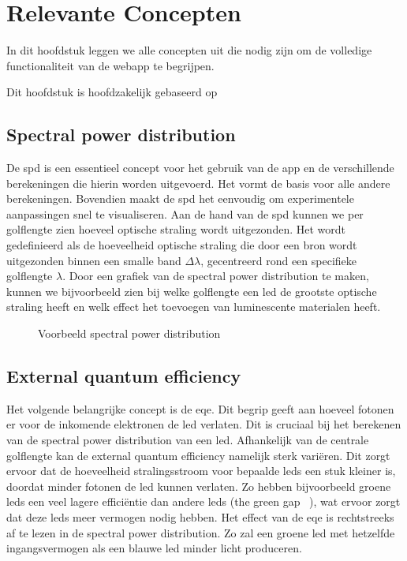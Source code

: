 \chapter{Relevante Concepten}\label{ch:concepten}

In dit hoofdstuk leggen we alle concepten uit die nodig zijn om de volledige functionaliteit van de webapp te begrijpen.

Dit hoofdstuk is hoofdzakelijk gebaseerd op ~\cite{LightingTechnologyHandbook,InteriorLightingHandbook,Light-EmittingDiodes,FundamentalsofSolidStateLighting}

\section{Spectral power distribution}{\label{sec:spectral-power-distribution}}

De \gls{spd} is een essentieel concept voor het gebruik van de app en de verschillende berekeningen die hierin worden uitgevoerd. Het vormt de basis voor alle andere berekeningen. Bovendien maakt de \gls{spd} het eenvoudig om experimentele aanpassingen snel te visualiseren. Aan de hand van de \gls{spd} kunnen we per golflengte zien hoeveel optische straling wordt uitgezonden. Het wordt gedefinieerd als de hoeveelheid optische straling die door een bron wordt uitgezonden binnen een smalle band $\Delta\lambda$, gecentreerd rond een specifieke golflengte $\lambda$. Door een grafiek van de spectral power distribution te maken, kunnen we bijvoorbeeld zien bij welke golflengte een \gls{led} de grootste optische straling heeft en welk effect het toevoegen van luminescente materialen heeft.

\begin{figure}[H]
    \centering
    \resizebox{0.7\textwidth}{!}{}
    \caption{Voorbeeld spectral power distribution}
    \label{fig:VBSPD}
\end{figure}

\section{External quantum efficiency}{\label{sec:external-quantum-efficiency}}

Het volgende belangrijke concept is de \gls{eqe}. Dit begrip geeft aan hoeveel fotonen er voor de inkomende elektronen de \gls{led} verlaten. Dit is cruciaal bij het berekenen van de spectral power distribution van een \gls{led}. Afhankelijk van de centrale golflengte kan de external quantum efficiency namelijk sterk vari\"eren. Dit zorgt ervoor dat de hoeveelheid stralingsstroom voor bepaalde \gls{led}s een stuk kleiner is, doordat minder fotonen de \gls{led} kunnen verlaten. Zo hebben bijvoorbeeld groene \gls{led}s een veel lagere effici\"entie dan andere \gls{led}s (the green gap ~\cite{ExternalQuantumEfficiency,hahnClosingGreenGapb,FrontiersEQE,zhuSolidStateLightingBased2016EQE}), wat ervoor zorgt dat deze \gls{led}s meer vermogen nodig hebben. Het effect van de \gls{eqe} is rechtstreeks af te lezen in de spectral power distribution. Zo zal een groene \gls{led} met hetzelfde ingangsvermogen als een blauwe \gls{led} minder licht produceren.

